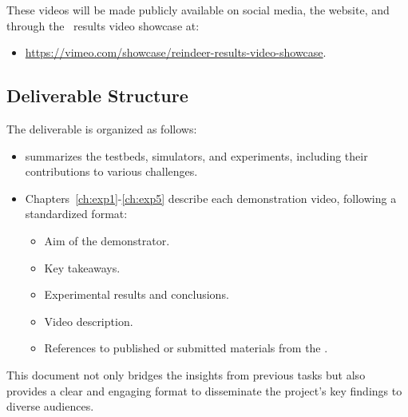 These videos will be made publicly available on social media, the \projectname website, and through the \projectname~results video showcase at:
\begin{itemize}
    \item[] \url{https://vimeo.com/showcase/reindeer-results-video-showcase}.
\end{itemize}


\subsection*{Deliverable Structure}
The deliverable is organized as follows:
\begin{itemize}
    \item {} summarizes the testbeds, simulators, and experiments, including their contributions to various challenges.
    \item Chapters~\ref{ch:exp1}-\ref{ch:exp5} describe each demonstration video, following a standardized format:
    \begin{itemize}
        \item Aim of the demonstrator.
        \item Key takeaways.
        \item Experimental results and conclusions.
        \item Video description.
        \item References to published or submitted materials from the \consortium.
    \end{itemize}
\end{itemize}

This document not only bridges the insights from previous tasks but also provides a clear and engaging format to disseminate the project's key findings to diverse audiences. 





